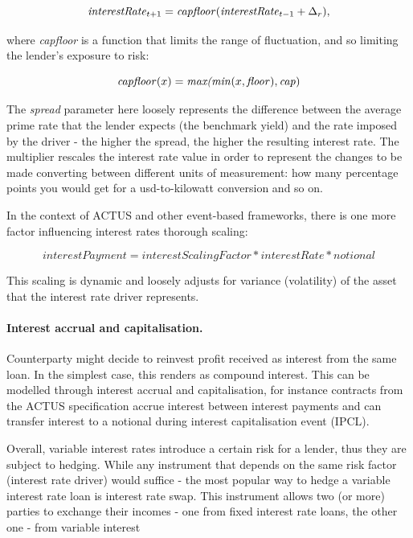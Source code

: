 \documentclass[runningheads]{llncs}
\newcommand{\ident}[1]{\mbox{\emph{#1}}}
\begin{document}
\noindent 
\begin{equation}
\ident{interestRate}_{t+1}=\ident{capfloor}(\ident{interestRate}_{t-1}+\Delta_{r}),
\end{equation}

\noindent
where \emph{capfloor} is a function that limits the range of fluctuation,  
and so limiting the lender's exposure to risk:

\noindent 
\begin{equation}
\ident{capfloor}(x)=\ident{max(min}(x,\ident{floor}),\ident{cap})
\end{equation}

\noindent
The \emph{spread} parameter here loosely represents the difference between
the average prime 
rate that the lender expects (the benchmark yield) and
the rate imposed by the driver - the higher the spread, the higher
the resulting interest rate. The multiplier %
rescales the interest rate value 
in order to represent the changes to be made converting between different units
of measurement: how many percentage points you would get for a usd-to-kilowatt conversion
and so on.

In the context of ACTUS and other event-based frameworks, there is
one more factor influencing interest rates thorough scaling:

\noindent 
\begin{equation}
interestPayment=interestScalingFactor*interestRate*notional
\end{equation}

This scaling is dynamic and loosely adjusts for variance (volatility)
of the asset that the interest rate driver represents.

\paragraph*{Interest accrual and capitalisation. }

Counterparty might decide to reinvest profit received as interest
from the same loan. In the simplest case, this renders as compound
interest. This can be modelled through interest accrual and capitalisation,
for instance contracts from the ACTUS specification accrue interest
between interest payments and can transfer interest to a notional
during interest capitalisation event (IPCL).

Overall, variable interest rates introduce a certain risk for a lender,
thus they are subject to hedging. While any instrument that depends
on the same risk factor (interest rate driver) would suffice - the
most popular way to hedge a variable interest rate loan is interest
rate swap. This instrument allows two (or more) parties to exchange
their incomes - one from fixed interest rate loans, the other one
- from variable interest
\end{document}

